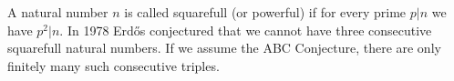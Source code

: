 \documentclass[12pt]{article}
\begin{document}
A natural number $n$ is called squarefull (or powerful) if for every prime $p | n$ we have $p^2 | n$. In 1978 Erd\H{o}s conjectured that we cannot have three consecutive squarefull natural numbers. If we assume the ABC Conjecture, there are only finitely many such consecutive triples.
\end{document}
